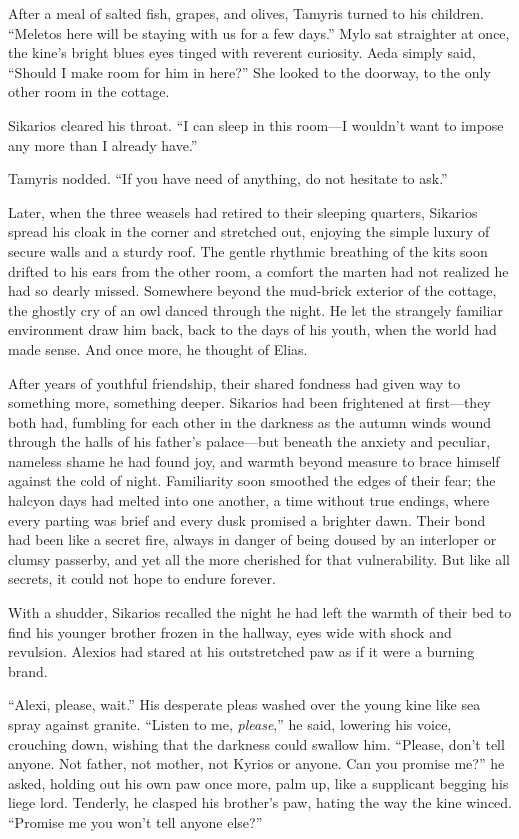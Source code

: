 After a meal of salted fish, grapes, and olives, Tamyris turned to his children. ``Meletos here will be staying with us for a few days.'' Mylo sat straighter at once, the kine's bright blues eyes tinged with reverent curiosity. Aeda simply said, ``Should I make room for him in here?'' She looked to the doorway, to the only other room in the cottage.

Sikarios cleared his throat. ``I can sleep in this room---I wouldn't want to impose any more than I already have.''

Tamyris nodded. ``If you have need of anything, do not hesitate to ask.''

Later, when the three weasels had retired to their sleeping quarters, Sikarios spread his cloak in the corner and stretched out, enjoying the simple luxury of secure walls and a sturdy roof. The gentle rhythmic breathing of the kits soon drifted to his ears from the other room, a comfort the marten had not realized he had so dearly missed. Somewhere beyond the mud-brick exterior of the cottage, the ghostly cry of an owl danced through the night. He let the strangely familiar environment draw him back, back to the days of his youth, when the world had made sense. And once more, he thought of Elias.

After years of youthful friendship, their shared fondness had given way to something more, something deeper. Sikarios had been frightened at first---they both had, fumbling for each other in the darkness as the autumn winds wound through the halls of his father's palace---but beneath the anxiety and peculiar, nameless shame he had found joy, and warmth beyond measure to brace himself against the cold of night. Familiarity soon smoothed the edges of their fear; the halcyon days had melted into one another, a time without true endings, where every parting was brief and every dusk promised a brighter dawn. Their bond had been like a secret fire, always in danger of being doused by an interloper or clumsy passerby, and yet all the more cherished for that vulnerability. But like all secrets, it could not hope to endure forever.

With a shudder, Sikarios recalled the night he had left the warmth of their bed to find his younger brother frozen in the hallway, eyes wide with shock and revulsion. Alexios had stared at his outstretched paw as if it were a burning brand.

``Alexi, please, wait.'' His desperate pleas washed over the young kine like sea spray against granite. ``Listen to me, \emph{please},'' he said, lowering his voice, crouching down, wishing that the darkness could swallow him. ``Please, don't tell anyone. Not father, not mother, not Kyrios or anyone. Can you promise me?'' he asked, holding out his own paw once more, palm up, like a supplicant begging his liege lord. Tenderly, he clasped his brother's paw, hating the way the kine winced. ``Promise me you won't tell anyone else?''

